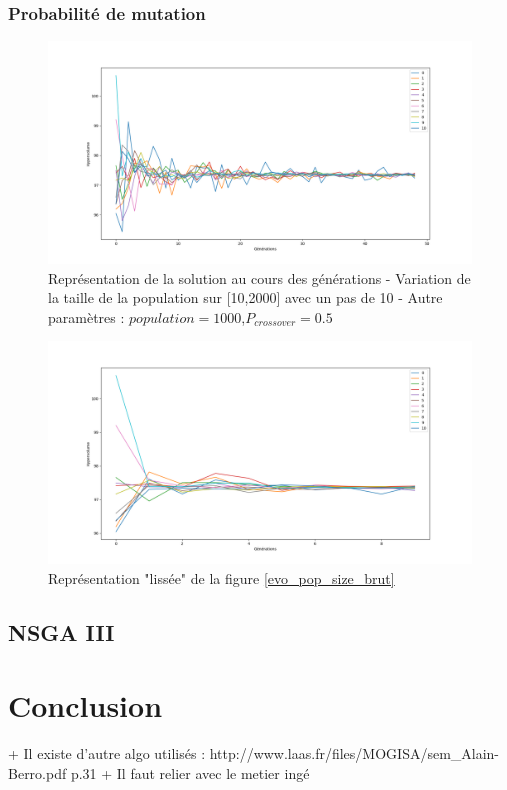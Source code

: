 \documentclass[12pt]{report}
\begin{document}
      \subsection{Probabilité de mutation}
      \begin{figure}[h]
        \centering
        \includegraphics[width=15cm]{img/mutation_sch_moy.png}
        \caption{Représentation de la solution au cours des générations - Variation de la taille de la population sur [10,2000] avec un pas de 10 - Autre paramètres : $population = 1000$,$P_{crossover} = 0.5$}
        \label{sch_mutation_moy}
      \end{figure}

      \begin{figure}[!]
        \centering
        \includegraphics[width=15cm]{img/mutation_sch_liss.png}
        \caption{Représentation "lissée" de la figure \ref{evo_pop_size_brut}}
        \label{sch_mutation_liss}
      \end{figure}
    \section{NSGA III}


  \chapter{Conclusion}
   + Il existe d'autre algo utilisés : http://www.laas.fr/files/MOGISA/sem_Alain-Berro.pdf p.31
   + Il faut relier avec le metier ingé
\end{document}
